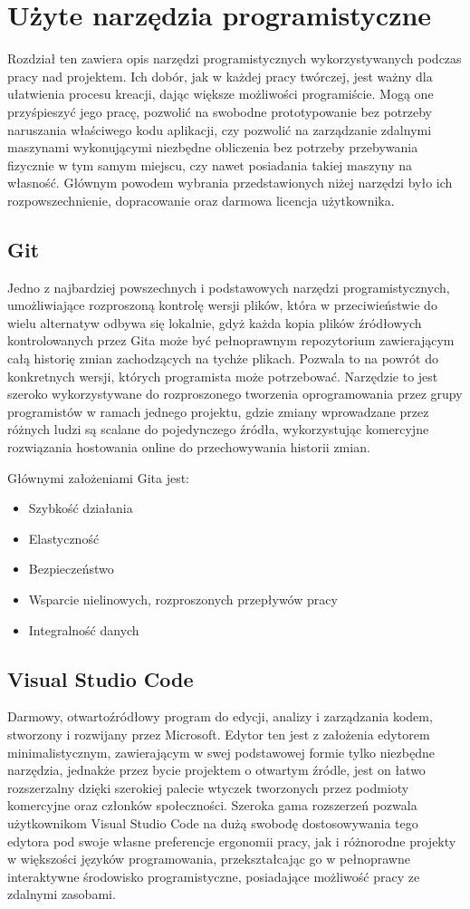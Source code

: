 \chapter{Użyte narzędzia programistyczne}
Rozdział ten zawiera opis narzędzi programistycznych wykorzystywanych podczas pracy nad projektem. Ich dobór, jak w każdej pracy twórczej, jest ważny dla ułatwienia procesu kreacji, dając większe możliwości programiście. Mogą one przyśpieszyć jego pracę, pozwolić na swobodne prototypowanie bez potrzeby naruszania właściwego kodu aplikacji, czy pozwolić na zarządzanie zdalnymi maszynami wykonującymi niezbędne obliczenia bez potrzeby przebywania fizycznie w tym samym miejscu, czy nawet posiadania takiej maszyny na własność. Głównym powodem wybrania przedstawionych niżej narzędzi było ich rozpowszechnienie, dopracowanie oraz darmowa licencja użytkownika.

\section{Git}
Jedno z najbardziej powszechnych i podstawowych narzędzi programistycznych, umożliwiające rozproszoną kontrolę wersji plików, która w przeciwieństwie do wielu alternatyw odbywa się lokalnie, gdyż każda kopia plików źródłowych kontrolowanych przez Gita może być pełnoprawnym repozytorium zawierającym całą historię zmian zachodzących na tychże plikach. Pozwala to na powrót do konkretnych wersji, których programista może potrzebować. Narzędzie to jest szeroko wykorzystywane do rozproszonego tworzenia oprogramowania przez grupy programistów w ramach jednego projektu, gdzie zmiany wprowadzane przez różnych ludzi są scalane do pojedynczego źródła, wykorzystując komercyjne rozwiązania hostowania online do przechowywania historii zmian.

Głównymi założeniami Gita jest:
\begin{itemize}
	\item Szybkość działania
	\item Elastyczność
	\item Bezpieczeństwo
	\item Wsparcie nielinowych, rozproszonych przepływów pracy
	\item Integralność danych
\end{itemize}

\section{Visual Studio Code}
Darmowy, otwartoźródłowy program do edycji, analizy i zarządzania kodem, stworzony i rozwijany przez Microsoft. Edytor ten jest z założenia edytorem minimalistycznym, zawierającym w swej podstawowej formie tylko niezbędne narzędzia, jednakże przez bycie projektem o otwartym źródle, jest on łatwo rozszerzalny dzięki szerokiej palecie wtyczek tworzonych przez podmioty komercyjne oraz członków społeczności. Szeroka gama rozszerzeń pozwala użytkownikom Visual Studio Code na dużą swobodę dostosowywania tego edytora pod swoje własne preferencje ergonomii pracy, jak i różnorodne projekty w większości języków programowania, przekształcając go w pełnoprawne interaktywne środowisko programistyczne, posiadające możliwość pracy ze zdalnymi zasobami.

